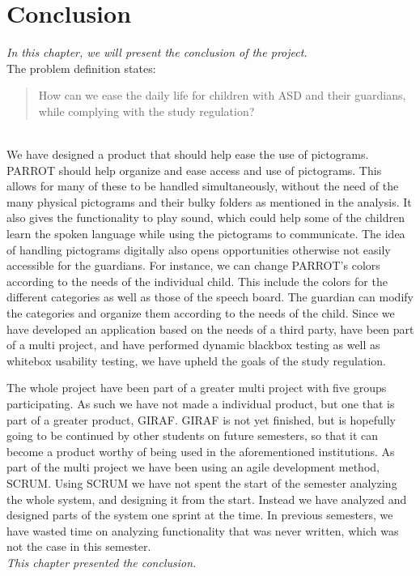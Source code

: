 \chapter{Conclusion}

\textit{In this chapter, we will present the conclusion of the project.}\newline
\\
The problem definition states:
\begin{quote}
How can we ease the daily life for children with ASD and their guardians, while complying with the study regulation?
\end{quote}
\\
We have designed a product that should help ease the use of pictograms. 
PARROT should help organize and ease access and use of pictograms. This allows for many of these to be handled simultaneously, without the need of the many physical pictograms and their bulky folders as mentioned in the analysis.\newline
It also gives the functionality to play sound, which could help some of the children learn the spoken language while using the pictograms to communicate. 
The idea of handling pictograms digitally also opens opportunities otherwise not easily accessible for the guardians.
For instance, we can change PARROT's colors according to the needs of the individual child. This include the colors for the different categories as well as those of the speech board.
The guardian can modify the categories and organize them according to the needs of the child.\newline
Since we have developed an application based on the needs of a third party, have been part of a multi project, and have performed dynamic blackbox testing as well as whitebox usability testing, we have upheld the goals of the study regulation.\newline

The whole project have been part of a greater multi project with five groups participating. 
As such we have not made a individual product, but one that is part of a greater product, GIRAF.  
GIRAF is not yet finished, but is hopefully going to be continued by other students on future semesters, so that it can become a product worthy of being used in the aforementioned institutions.\newline
As part of the multi project we have been using an agile development method, SCRUM.
Using SCRUM we have not spent the start of the semester analyzing the whole system, and designing it from the start. Instead we have analyzed and designed parts of the system one sprint at the time.
In previous semesters, we have wasted time on analyzing functionality that was never written, which was not the case in this semester.\newline
\\
\textit{This chapter presented the conclusion.}